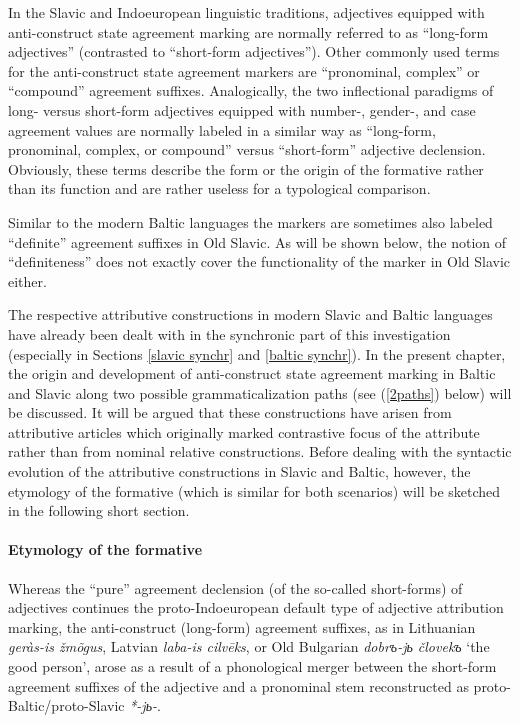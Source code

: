 In the Slavic and Indoeuropean linguistic traditions, adjectives equipped with anti-construct state agreement marking are normally referred to as “long-form adjectives” (contrasted to “short-form adjectives”). Other commonly used terms for the anti-construct state agreement markers are “pronominal, complex” or “compound” agreement suffixes. Analogically, the two inflectional paradigms of long- versus short-form adjectives equipped with number-, gender-, and case agreement values are normally labeled in a similar way as “long-form, pronominal, complex, or compound” versus “short-form” adjective declension. Obviously, these terms describe the form or the origin of the formative rather than its function and are rather useless for a typological comparison.

Similar to the modern Baltic languages the markers are sometimes also labeled “definite” agreement suffixes in Old Slavic. As will be shown below, the notion of “definiteness” does not exactly cover the functionality of the marker in Old Slavic either.

The respective attributive constructions in modern Slavic and Baltic languages have already been dealt with in the synchronic part of this investigation (especially in Sections \ref{slavic synchr} and \ref{baltic synchr}). In the present chapter, the origin and development of anti-construct state agreement marking in Baltic and Slavic along two possible grammaticalization paths (see (\ref{2paths}) below) will be discussed. It will be argued that these constructions have arisen from attributive articles which originally marked contrastive focus of the attribute rather than from nominal relative constructions. Before dealing with the syntactic evolution of the attributive constructions in Slavic and Baltic, however, the etymology of the formative (which is similar for both scenarios) will be sketched in the following short section.

\paragraph{Etymology of the formative} 
Whereas the “pure” agreement declension (of the so-called short-forms) of adjectives continues the proto-Indoeuropean default type of adjective attribution marking, the anti-construct (long-form) agreement suffixes, as in Lithuanian \textit{geràs-is žmõgus}, Latvian \textit{laba-is cilvēks}, or Old Bulgarian \textit{dobrъ-jь človekъ} ‘the good person’, arose as a result of a phonological merger between the short-form agreement suffixes of the adjective and a pronominal stem reconstructed as proto-Baltic/proto-Slavic \textit{*-jь-}.

